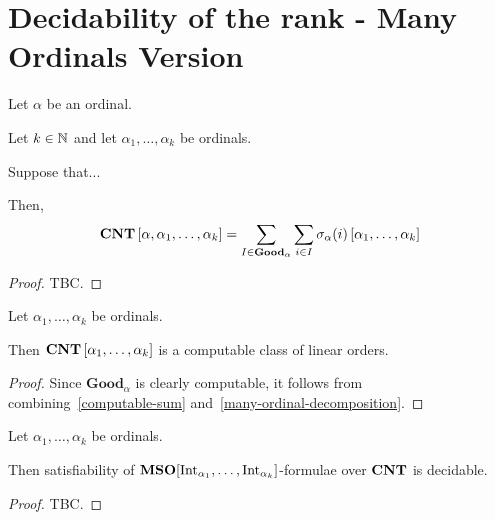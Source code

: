 \section{Decidability of the rank - Many Ordinals Version}

\begin{lemma}{\label{many-ordinal-decomposition}}
  Let $\alpha$ be an ordinal.

  Let $k \in \mathbb{N}$ and let $\alpha_1, \ldots, \alpha_k$ be ordinals.

  Suppose that...

  Then,
  \[
    \mathbf{CNT} \left[ {\alpha, \alpha_1, \ldots, \alpha_k} \right]
    = \sum_{I \in \mathbf{Good}_{\alpha}} \sum_{i \in I} \sigma_\alpha(i) \left[ {\alpha_1, \ldots, \alpha_k} \right]
  \]
\end{lemma}

\begin{proof}
  TBC.
\end{proof}

\begin{corollary}\label{countables-computable-many-ordinals}
  Let $\alpha_1, \ldots, \alpha_k$ be ordinals.

  Then $\mathbf{CNT} \left[ {\alpha_1, \ldots, \alpha_k} \right]$ is a computable class of linear orders.
\end{corollary}

\begin{proof}
  Since $\mathbf{Good}_{\alpha}$ is clearly computable,
  it follows from combining~\cref{computable-sum} and~\cref{many-ordinal-decomposition}.
\end{proof}

\begin{theorem}\label{many-ordinals-satisfiability}
  Let $\alpha_1, \ldots, \alpha_k$ be ordinals.

  Then satisfiability of $\mathbf{MSO}[\mathrm{Int}_{\alpha_1}, \ldots, \mathrm{Int}_{\alpha_k}]$-formulae
  over $\mathbf{CNT}$ is decidable.
\end{theorem}

\begin{proof}
  TBC.
\end{proof}
